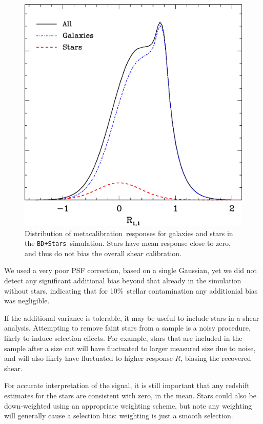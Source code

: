\documentclass[usegraphicx,usenatbib]{mn2e}
\newcommand{\mcal}{metacalibration}
\newcommand{\mcalR}{$R$}
\newcommand{\nsimNstarperc}{10\%}
\newcommand{\bdstar}{\texttt{BD+Stars}}
\begin{document}
\begin{figure}
    \centering
    \includegraphics[scale=0.45]{R-bd29-bd29stars.eps}

    \caption{Distribution of \mcal\ responses for galaxies and stars in
    the \bdstar\ simulation.  Stars have mean response close to zero,
    and thus do not bias the overall shear calibration.}

\label{fig:Rstars}
\end{figure}

We used a very poor PSF correction, based on a single Gaussian, yet we did not
detect any significant additional bias beyond that already in the simulation
without stars, indicating that for \nsimNstarperc\ stellar contamination
any additionial bias was negligible.

If the
additional variance is tolerable, it may be useful to include stars in a shear
analysis.  Attempting to remove faint stars from a sample is a noisy procedure,
likely to induce selection effects. For example, stars that are included in the
sample after a size cut will have fluctuated to larger measured size due to
noise, and will also likely have fluctuated to higher response \mcalR, biasing
the recovered shear.

For accurate interpretation of the signal, it is still important that any
redshift estimates for the stars are consistent with zero, in the mean.  Stars
could also be down-weighted using an appropriate weighting scheme, but note any
weighting will generally cause a selection bias: weighting is just a smooth
selection.
\end{document}
